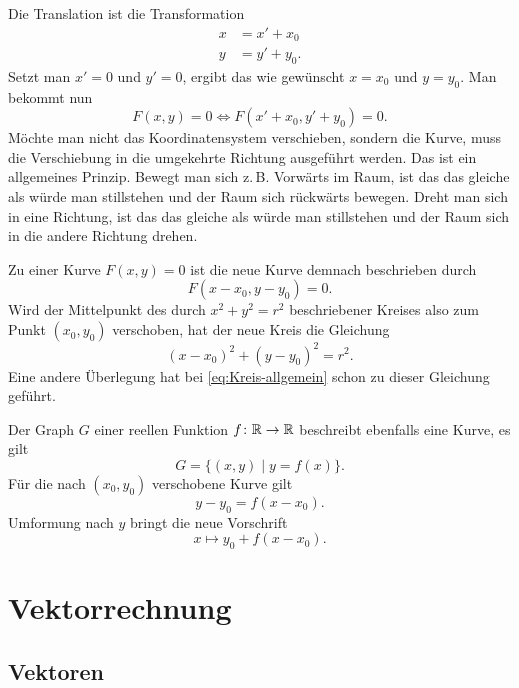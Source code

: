 Die Translation ist die Transformation
\begin{equation}
\begin{split}
x &= x'+x_0\\
y &= y'+y_0.
\end{split}
\end{equation}
Setzt man $x'=0$ und $y'=0$, ergibt das wie gewünscht
$x=x_0$ und $y=y_0$. Man bekommt nun
\begin{equation}
F(x,y)=0 \iff F(x'+x_0, y'+y_0)=0.
\end{equation}
Möchte man nicht das Koordinatensystem verschieben, sondern
die Kurve, muss die Verschiebung in die umgekehrte Richtung
ausgeführt werden. Das ist ein allgemeines Prinzip. Bewegt man
sich z.\,B. Vorwärts im Raum, ist das das gleiche als würde man
stillstehen und der Raum sich rückwärts bewegen. Dreht man sich
in eine Richtung, ist das das gleiche als würde man stillstehen
und der Raum sich in die andere Richtung drehen.

Zu einer Kurve $F(x,y)=0$ ist die neue Kurve demnach beschrieben
durch%
\begin{equation}
F(x-x_0, y-y_0) = 0.
\end{equation}
Wird der Mittelpunkt des durch $x^2+y^2=r^2$ beschriebener Kreises
also zum Punkt $(x_0,y_0)$ verschoben, hat der neue Kreis die
Gleichung
\begin{equation}
(x-x_0)^2 + (y-y_0)^2 = r^2.
\end{equation}
Eine andere Überlegung hat bei \eqref{eq:Kreis-allgemein}
schon zu dieser Gleichung geführt.

Der Graph $G$ einer reellen Funktion $f\colon\mathbb R\to\mathbb R$ beschreibt
ebenfalls eine Kurve, es gilt
\begin{equation}
G = \{(x,y)\mid y=f(x)\}.
\end{equation}
Für die nach $(x_0,y_0)$ verschobene Kurve gilt
\begin{equation}
y-y_0 = f(x-x_0).
\end{equation}
Umformung nach $y$ bringt die neue Vorschrift
\begin{equation}
x\mapsto y_0+f(x-x_0).
\end{equation}

\section{Vektorrechnung}

\subsection{Vektoren}

